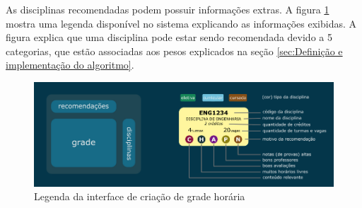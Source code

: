 As disciplinas recomendadas podem possuir informações extras. A figura \ref{fig:legenda-interface} mostra uma legenda disponível no sistema explicando as informações exibidas. A figura explica que uma disciplina pode estar sendo recomendada devido a 5 categorias, que estão associadas aos pesos explicados na seção \ref{sec:Definição e implementação do algoritmo}.

\begin{figure}[ht]
    \begin{center}
    \includegraphics[width=360pt]{figuras/legenda-interface.png}
    \caption{Legenda da interface de criação de grade horária}
    \label{fig:legenda-interface}
    \end{center}
\end{figure}